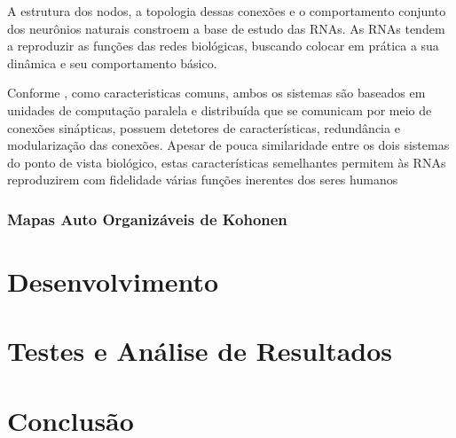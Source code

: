 \documentclass[
	12pt,				%
	openright,			%
	twoside,			%
	a4paper,			%
	english,			%
	french,				%
	spanish,			%
	brazil				%
	]{abntex2}
\begin{document}
A estrutura dos nodos, a topologia dessas conexões e o comportamento conjunto dos neurônios naturais constroem a base de estudo das RNAs. As RNAs tendem a reproduzir as funções das redes biológicas, buscando colocar em prática a sua dinâmica e seu comportamento básico. 

Conforme , como caracteristicas comuns, ambos os sistemas são baseados em unidades de computação paralela e distribuída que se comunicam por meio de conexões sinápticas, possuem detetores de características, redundância e modularização das conexões. Apesar de pouca similaridade entre os dois sistemas do ponto de vista biológico, estas características semelhantes permitem às RNAs reproduzirem com fidelidade várias funções inerentes dos seres humanos
\subsection{Mapas Auto Organizáveis de Kohonen}
\chapter{Desenvolvimento}
\chapter{Testes e Análise de Resultados}
\chapter{Conclusão}
\postextual


%
%



\partapendices


\printindex
\end{document}
